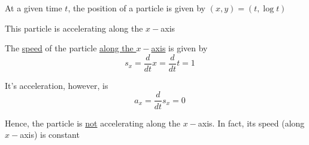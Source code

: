 \documentclass[14pt,fleqn]{extarticle}
\begin{document}
 
\begin{snippet}
    
    \incorrect
    
    At a given time $t$, the position of a particle is given by $(x,y) = \left(t, \log t \right)$\newline
    
    This particle is accelerating along the $x-$axis
    \reason
    
    The \underline{speed} of the particle \underline{along the $x-$axis} is given by \[\quad s_x = \frac{d}{dt} x = \frac{d}{dt} t = 1\]
    
    It's acceleration, however, is 
    \[ \quad a_x = \frac{d}{dt} s_x  = 0 \]
    
    Hence, the particle is \underline{not} accelerating along the $x-$axis. In fact, its speed (along $x-$axis) is constant 
    
\end{snippet} 
\end{document}
